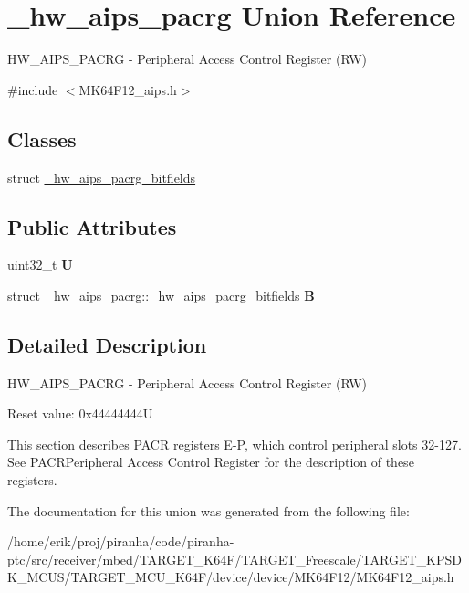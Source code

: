 \hypertarget{union__hw__aips__pacrg}{}\section{\+\_\+hw\+\_\+aips\+\_\+pacrg Union Reference}
\label{union__hw__aips__pacrg}


H\+W\+\_\+\+A\+I\+P\+S\+\_\+\+P\+A\+C\+RG -\/ Peripheral Access Control Register (RW)  




{\ttfamily \#include $<$M\+K64\+F12\+\_\+aips.\+h$>$}

\subsection*{Classes}
\begin{DoxyCompactItemize}
\item 
struct \hyperlink{struct__hw__aips__pacrg_1_1__hw__aips__pacrg__bitfields}{\+\_\+hw\+\_\+aips\+\_\+pacrg\+\_\+bitfields}
\end{DoxyCompactItemize}
\subsection*{Public Attributes}
\begin{DoxyCompactItemize}
\item 
uint32\+\_\+t {\bfseries U}\hypertarget{union__hw__aips__pacrg_a5d36215c4ad21cc61091e613a3a553e4}{}\label{union__hw__aips__pacrg_a5d36215c4ad21cc61091e613a3a553e4}

\item 
struct \hyperlink{struct__hw__aips__pacrg_1_1__hw__aips__pacrg__bitfields}{\+\_\+hw\+\_\+aips\+\_\+pacrg\+::\+\_\+hw\+\_\+aips\+\_\+pacrg\+\_\+bitfields} {\bfseries B}\hypertarget{union__hw__aips__pacrg_a8900d7849e05d9749382fe350a0e8938}{}\label{union__hw__aips__pacrg_a8900d7849e05d9749382fe350a0e8938}

\end{DoxyCompactItemize}


\subsection{Detailed Description}
H\+W\+\_\+\+A\+I\+P\+S\+\_\+\+P\+A\+C\+RG -\/ Peripheral Access Control Register (RW) 

Reset value\+: 0x44444444U

This section describes P\+A\+CR registers E-\/P, which control peripheral slots 32-\/127. See P\+A\+C\+R\+Peripheral Access Control Register for the description of these registers. 

The documentation for this union was generated from the following file\+:\begin{DoxyCompactItemize}
\item 
/home/erik/proj/piranha/code/piranha-\/ptc/src/receiver/mbed/\+T\+A\+R\+G\+E\+T\+\_\+\+K64\+F/\+T\+A\+R\+G\+E\+T\+\_\+\+Freescale/\+T\+A\+R\+G\+E\+T\+\_\+\+K\+P\+S\+D\+K\+\_\+\+M\+C\+U\+S/\+T\+A\+R\+G\+E\+T\+\_\+\+M\+C\+U\+\_\+\+K64\+F/device/device/\+M\+K64\+F12/M\+K64\+F12\+\_\+aips.\+h\end{DoxyCompactItemize}

